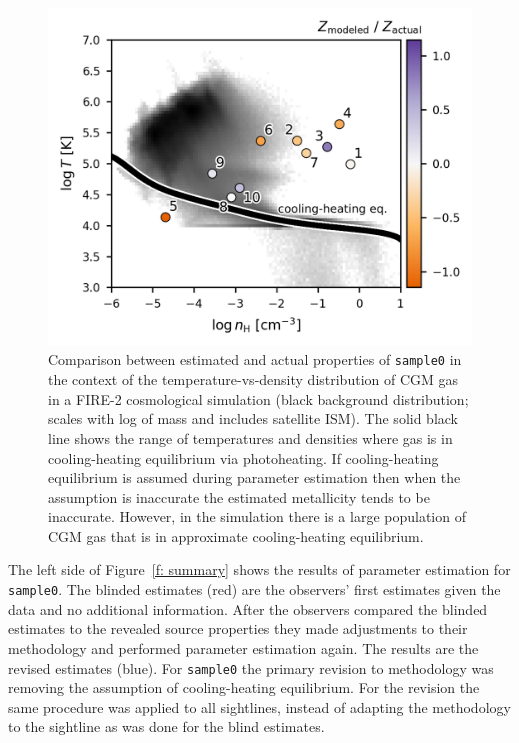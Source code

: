 \documentclass[fleqn,usenatbib]{mnras}
\begin{document}
\begin{figure}
    \centering
    \includegraphics[width=\columnwidth]{figures/sample0/phase_space.png}
    \caption{
    Comparison between estimated and actual properties of \texttt{sample0} in the context of the temperature-vs-density distribution of CGM gas in a FIRE-2 cosmological simulation (black background distribution; scales with log of mass and includes satellite ISM).
    The solid black line shows the range of temperatures and densities where gas is in cooling-heating equilibrium via photoheating.
    If cooling-heating equilibrium is assumed during parameter estimation then when the assumption is inaccurate the estimated metallicity tends to be inaccurate.
    However, in the simulation there is a large population of CGM gas that is in approximate cooling-heating equilibrium.
    }
    \label{f: idealized explanation}
\end{figure}

The left side of Figure~\ref{f: summary} shows the results of parameter estimation for \texttt{sample0}.
The blinded estimates (red)  are the observers' first estimates given the data and no additional information.
After the observers compared the blinded estimates to the revealed source properties they made adjustments to their methodology and performed parameter estimation again.
The results are the revised estimates (blue).
For \texttt{sample0} the primary revision to methodology was removing the assumption of cooling-heating equilibrium.
For the revision the same procedure was applied to all sightlines, instead of adapting the methodology to the sightline as was done for the blind estimates.
\end{document}

